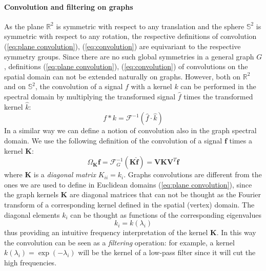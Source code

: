 \paragraph{Convolution and filtering on graphs}
 As the plane $\mathbb R^2$ is symmetric with respect to any translation and the sphere $\mathbb S^2$ is symmetric with respect to any rotation, the respective definitions of convolution (\ref{eq:plane convolution}), (\ref{eq:convolution}) are equivariant to the respective symmetry groups. Since there are no such global symmetries in a general graph $G$, definitions (\ref{eq:plane convolution}), (\ref{eq:convolution}) of convolutions on the spatial domain can not be extended naturally on graphs. However, both on $\mathbb R^2$ and on $\mathbb S^2$, the convolution of a signal $f$ with a kernel $k$ can be performed in the spectral domain by multiplying the transformed signal $\hat f$ times the transformed kernel $\hat k$: 
\begin{equation}\label{eq:convolution normal}
f*k = \mathcal F^{-1}(\hat f \cdot \hat k)
\end{equation}
In a similar way we can define a notion of convolution also in the graph spectral domain. We use the following definition \cite{Vandergheynst} of the convolution of a signal $\mathbf f$ times a kernel $\mathbf K$:
\begin{equation}\label{eq:graph convolution}
	\Omega_\mathbf K\mathbf f = \mathcal{F}^{-1}_G(\mathbf K \hat {\mathbf f})= \mathbf V\mathbf K  \mathbf V^T {\mathbf f}
\end{equation}
where $\mathbf K$ is a \textit{diagonal} \textit{matrix} $K_{ii} = k_i$. Graphs convolutions are different from the ones we are used to define in Euclidean domains (\ref{eq:plane convolution}), since the graph kernels $\mathbf K$ are diagonal matrices that can not be thought as the Fourier transform of a corresponding kernel defined in the spatial (vertex) domain. The diagonal elements $k_{i}$ can be thought as functions of the corresponding eigenvalues 
$$
k_{i}= k(\lambda_i)
$$
thus providing an intuitive frequency interpretation of the kernel $\mathbf K$. In this way the convolution can be seen as a \textit{filtering} operation: for example, a kernel $k(\lambda_i) = \exp (-\lambda_i)$ will be the kernel of a low-pass filter since it will cut the high frequencies.

